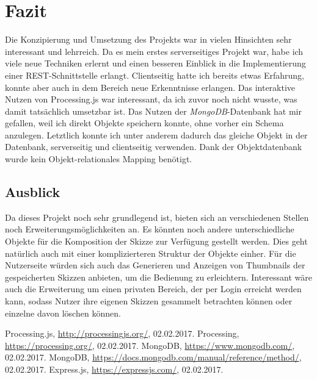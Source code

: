 \documentclass[12pt, ngerman, utf8]{article}
\begin{document}
\section{Fazit}
Die Konzipierung und Umsetzung des Projekts war in vielen Hinsichten sehr interessant und lehrreich. Da es mein erstes serverseitiges Projekt war, habe ich viele neue Techniken erlernt und einen besseren Einblick in die Implementierung einer REST-Schnittstelle erlangt. Clientseitig hatte ich bereits etwas Erfahrung, konnte aber auch in dem Bereich neue Erkenntnisse erlangen. Das interaktive Nutzen von Processing.js war interessant, da ich zuvor noch nicht wusste, was damit tatsächlich umsetzbar ist. Das Nutzen der \emph{MongoDB}-Datenbank hat mir gefallen, weil ich direkt Objekte speichern konnte, ohne vorher ein Schema anzulegen. Letztlich konnte ich unter anderem dadurch das gleiche Objekt  in der Datenbank, serverseitig und clientseitig verwenden. Dank der Objektdatenbank wurde kein Objekt-relationales Mapping benötigt.

\subsection{Ausblick}
Da dieses Projekt noch sehr grundlegend ist, bieten sich an verschiedenen Stellen noch Erweiterungsmöglichkeiten an. Es könnten noch andere unterschiedliche Objekte für die Komposition der Skizze zur Verfügung gestellt werden. Dies geht natürlich auch mit einer komplizierteren Struktur der Objekte einher.
Für die Nutzerseite würden sich auch das Generieren und Anzeigen von Thumbnails der gespeicherten Skizzen anbieten, um die Bedienung zu erleichtern.
Interessant wäre auch die Erweiterung um einen privaten Bereich, der per Login erreicht werden kann, sodass Nutzer ihre eigenen Skizzen gesammelt betrachten können oder einzelne davon löschen können.

\nocite{*}

\begin{thebibliography}{9}
  Processing.js, \url{http://processingjs.org/}, 02.02.2017.
  Processing, \url{https://processing.org/}, 02.02.2017.
  MongoDB, \url{https://www.mongodb.com/}, 02.02.2017.
  MongoDB, \url{https://docs.mongodb.com/manual/reference/method/}, 02.02.2017.
  Express.js, \url{https://expressjs.com/}, 02.02.2017.
  



\end{thebibliography}
\end{document}
